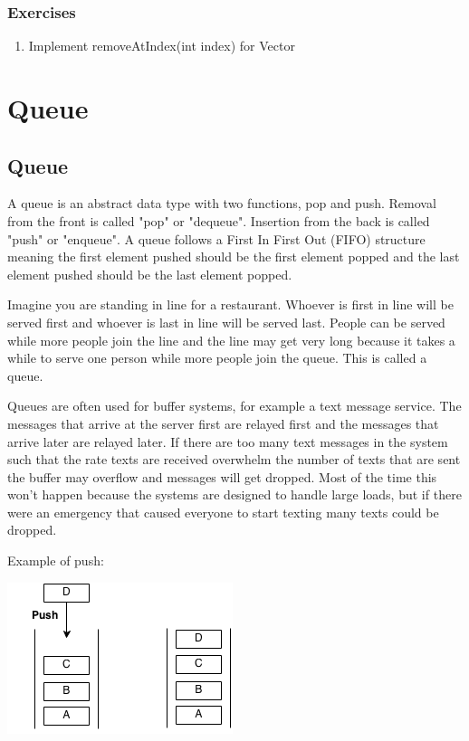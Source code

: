 \documentclass[11pt,oneside]{book}
\makeatletter
\def\maxwidth#1{\ifdim\Gin@nat@width>#1 #1\else\Gin@nat@width\fi}
\makeatother
\begin{document}
\subsection{Exercises}

\begin{enumerate}
\item Implement removeAtIndex(int index) for Vector
\end{enumerate}

    \chapter{ Queue }
        \section{ Queue }
        

A queue is an abstract data type with two functions, pop and push. Removal from the front is called "pop" or "dequeue". Insertion from the back is called "push" or "enqueue". A queue follows a First In First Out (FIFO) structure meaning the first element pushed should be the first element popped and the last element pushed should be the last element popped.

Imagine you are standing in line for a restaurant. Whoever is first in line will be served first and whoever is last in line will be served last. People can be served while more people join the line and the line may get very long because it takes a while to serve one person while more people join the queue. This is called a queue.

Queues are often used for buffer systems, for example a text message service. The messages that arrive at the server first are relayed first and the messages that arrive later are relayed later. If there are too many text messages in the system such that the rate  texts are received overwhelm the number of texts that are sent the buffer may overflow and messages will get dropped. Most of the time this won't happen because the systems are designed to handle large loads, but if there were an emergency that caused everyone to start texting many texts could be dropped.

Example of push:

\vspace{5px}\includegraphics[width=\maxwidth{\textwidth}]{queue.png}
\end{document}
